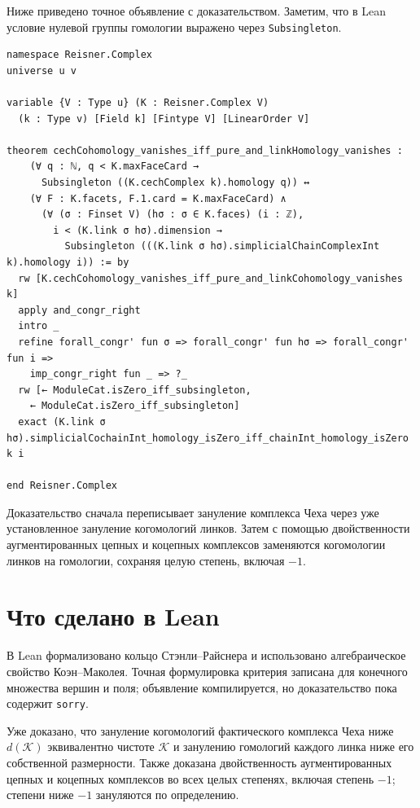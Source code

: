 \documentclass[11pt]{amsart}
\begin{document}
Ниже приведено точное объявление с доказательством. Заметим, что в Lean условие нулевой
группы гомологии выражено через \texttt{Subsingleton}.
\begin{lstlisting}[style=leanstyle]
namespace Reisner.Complex
universe u v

variable {V : Type u} (K : Reisner.Complex V)
  (k : Type v) [Field k] [Fintype V] [LinearOrder V]

theorem cechCohomology_vanishes_iff_pure_and_linkHomology_vanishes :
    (∀ q : ℕ, q < K.maxFaceCard →
      Subsingleton ((K.cechComplex k).homology q)) ↔
    (∀ F : K.facets, F.1.card = K.maxFaceCard) ∧
      (∀ (σ : Finset V) (hσ : σ ∈ K.faces) (i : ℤ),
        i < (K.link σ hσ).dimension →
          Subsingleton (((K.link σ hσ).simplicialChainComplexInt k).homology i)) := by
  rw [K.cechCohomology_vanishes_iff_pure_and_linkCohomology_vanishes k]
  apply and_congr_right
  intro _
  refine forall_congr' fun σ => forall_congr' fun hσ => forall_congr' fun i =>
    imp_congr_right fun _ => ?_
  rw [← ModuleCat.isZero_iff_subsingleton,
    ← ModuleCat.isZero_iff_subsingleton]
  exact (K.link σ hσ).simplicialCochainInt_homology_isZero_iff_chainInt_homology_isZero k i

end Reisner.Complex
\end{lstlisting}

Доказательство сначала переписывает зануление комплекса Чеха через уже
установленное зануление когомологий линков. Затем с помощью двойственности
аугментированных цепных и коцепных комплексов заменяются когомологии линков на
гомологии, сохраняя целую степень, включая $-1$.
\section{Что сделано в Lean}

В Lean формализовано кольцо Стэнли--Райснера и использовано алгебраическое
свойство Коэн--Маколея. Точная формулировка критерия записана для конечного
множества вершин и поля; объявление компилируется, но доказательство пока
содержит \texttt{sorry}.

Уже доказано, что зануление когомологий фактического комплекса Чеха ниже
$d(\mathcal{K})$ эквивалентно чистоте $\mathcal{K}$ и занулению
гомологий каждого линка ниже его собственной размерности. Также доказана
двойственность аугментированных цепных и коцепных комплексов во всех целых
степенях, включая степень $-1$; степени ниже $-1$ зануляются по определению.
\end{document}
